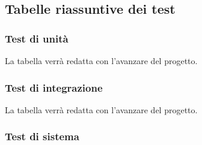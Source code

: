 \subsection{Tabelle riassuntive dei test}

\subsubsection{Test di unità}
La tabella verrà redatta con l'avanzare del progetto.

\subsubsection{Test di integrazione}
La tabella verrà redatta con l'avanzare del progetto.

\subsubsection{Test di sistema}
